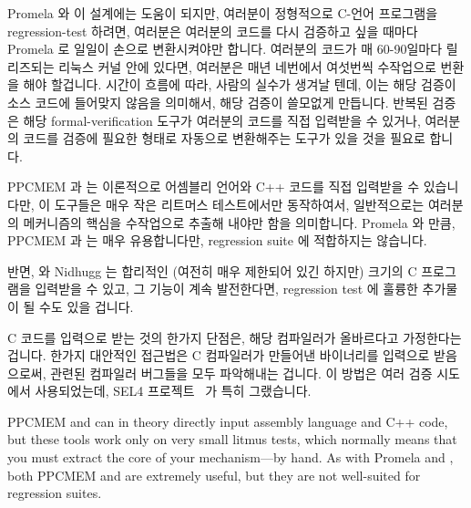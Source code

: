 Promela 와  이 설계에는 도움이 되지만, 여러분이 정형적으로 C-언어
프로그램을 regression-test 하려면, 여러분은 여러분의 코드를 다시 검증하고 싶을
때마다 Promela 로 일일이 손으로 변환시켜야만 합니다.
여러분의 코드가 매 60-90일마다 릴리즈되는 리눅스 커널 안에 있다면, 여러분은
매년 네번에서 여섯번씩 수작업으로 번환을 해야 할겁니다.
시간이 흐름에 따라, 사람의 실수가 생겨날 텐데, 이는 해당 검증이 소스 코드에
들어맞지 않음을 의미해서, 해당 검증이 쓸모없게 만듭니다.
반복된 검증은 해당 formal-verification 도구가 여러분의 코드를 직접 입력받을 수
있거나, 여러분의 코드를 검증에 필요한 형태로 자동으로 변환해주는 도구가 있을
것을 필요로 합니다.
\iffalse

Although Promela and \co{spin}
are invaluable design aids, if you need to formally regression-test
your C-language program, you must hand-translate to Promela each time
you would like to re-verify your code.
If your code happens to be in the Linux kernel, which releases every
60-90 days, you will need to hand-translate from four to six times
each year.
Over time, human error will creep in, which means that the verification
won't match the source code, rendering the verification useless.
Repeated verification clearly requires either that the formal-verification
tooling input your code directly, or that there be automatic translation
of your code to the form required for verification.
\fi

PPCMEM 과  는 이론적으로 어셈블리 언어와 C++ 코드를 직접 입력받을 수
있습니다만, 이 도구들은 매우 작은 리트머스 테스트에서만 동작하여서,
일반적으로는 여러분의 메커니즘의 핵심을 수작업으로 추출해 내야만 함을
의미합니다.
Promela 와  만큼, PPCMEM 과  는 매우 유용합니다만, regression
suite 에 적합하지는 않습니다.

반면,  와 Nidhugg 는 합리적인 (여전히 매우 제한되어 있긴 하지만)
크기의 C 프로그램을 입력받을 수 있고, 그 기능이 계속 발전한다면, regression
test 에 훌륭한 추가물이 될 수도 있을 겁니다.

C 코드를 입력으로 받는 것의 한가지 단점은, 해당 컴파일러가 올바르다고
가정한다는 겁니다.
한가지 대안적인 접근법은 C 컴파일러가 만들어낸 바이너리를 입력으로 받음으로써,
관련된 컴파일러 버그들을 모두 파악해내는 겁니다.
이 방법은 여러 검증 시도에서 사용되었는데, SEL4
프로젝트~\cite{ThomasSewell2013L4binaryVerification} 가 특히 그랬습니다.
\iffalse

PPCMEM and  can in theory directly input assembly language
and C++ code, but these tools work only on very small litmus tests,
which normally means that you must extract the core of your
mechanism---by hand.
As with Promela and , both PPCMEM and  are
extremely useful, but they are not well-suited for regression suites.

